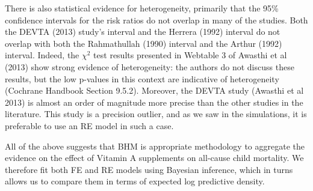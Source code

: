 \documentclass[12pt]{article}
\begin{document}
There is also statistical evidence for heterogeneity, primarily that the 95\% confidence intervals for the risk ratios do not overlap in many of the studies. Both the DEVTA (2013) study's interval and the Herrera (1992) interval do not overlap with both the Rahmathullah (1990) interval and the Arthur (1992) interval. Indeed, the $\chi^2$ test results presented in Webtable 3 of Awasthi et al (2013) show strong evidence of heterogeneity: the authors do not discuss these results, but the low p-values in this context are indicative of heterogeneity (Cochrane Handbook Section 9.5.2). Moreover, the DEVTA study (Awasthi et al 2013) is almost an order of magnitude more precise than the other studies in the literature. This study is a precision outlier, and as we saw in the simulations, it is preferable to use an RE model in such a case.

All of the above suggests that BHM is appropriate methodology to aggregate the evidence on the effect of Vitamin A supplements on all-cause child mortality. We therefore fit both FE and RE models using Bayesian inference, which in turns allows us to compare them in terms of expected log predictive density.






\end{document}
